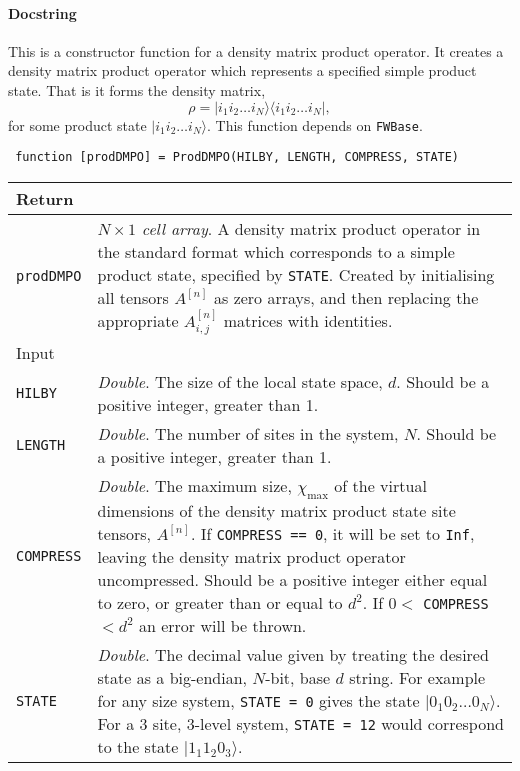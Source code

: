  \paragraph{Docstring} This is a constructor function for a density matrix product operator. It creates a density matrix product operator which represents a specified simple product state. That is it forms the density matrix,
 \begin{equation}
 \rho = | i_{1} i_{2} \ldots i_{N} \rangle \langle i_{1} i_{2} \ldots i_{N} |,
 \label{eq:vs3-3}
 \end{equation}
 for some product state \(|i_{1} i_{2} \ldots i_{N} \rangle\). This function depends on \lstinline$FWBase$.
 \begin{lstlisting}
 function [prodDMPO] = ProdDMPO(HILBY, LENGTH, COMPRESS, STATE) \end{lstlisting}
 \begin{longtabu}{X[1,l]X[4,l]}
 \hline
 Return & \\ \hline
 \lstinline$prodDMPO$ & \emph{\(N \times 1\) cell array}. A density matrix product operator in the standard format which corresponds to a simple product state, specified by \lstinline$STATE$. Created by initialising all tensors \(A^{[n]}\) as zero arrays, and then replacing the appropriate \(A^{[n]}_{i,j}\) matrices with identities. \\ \hline
 Input & \\ \hline
 \lstinline$HILBY$ & \emph{Double}. The size of the local state space, \(d\). Should be a positive integer, greater than 1. \\
 \lstinline$LENGTH$ & \emph{Double}. The number of sites in the system, \(N\). Should be a positive integer, greater than 1. \\
 \lstinline$COMPRESS$ & \emph{Double}. The maximum size, \(\chi_{\mathrm{max}}\) of the virtual dimensions of the density matrix product state site tensors, \(A^{[n]}\). If \lstinline$COMPRESS == 0$, it will be set to \lstinline$Inf$, leaving the density matrix product operator uncompressed. Should be a positive integer either equal to zero, or greater than or equal to \(d^{2}\). If \(0 <\) \lstinline$COMPRESS$ \(< d^{2}\) an error will be thrown. \\
 \lstinline$STATE$ & \emph{Double}. The decimal value given by treating the desired state as a big-endian, \(N\)-bit, base \(d\) string. For example for any size system, \lstinline$STATE = 0$ gives the state \(| 0_{1} 0_{2} \ldots 0_{N} \rangle \). For a 3 site, 3-level system, \lstinline$STATE = 12$ would correspond to the state \(|1_{1} 1_{2} 0_{3} \rangle\).  \\
 \hline
 \end{longtabu}

